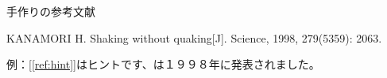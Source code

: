 \chapter{\bibname}

\begin{manref}
\item \label{ref:hint} 手作りの参考文献
\item {}
\item {}
\item \label{ref:man} KANAMORI H. Shaking without quaking[J]. Science, 1998, 279(5359): 2063.
\end{manref}

例：[\ref{ref:hint}]はヒントです、は１９９８年に発表されました。
